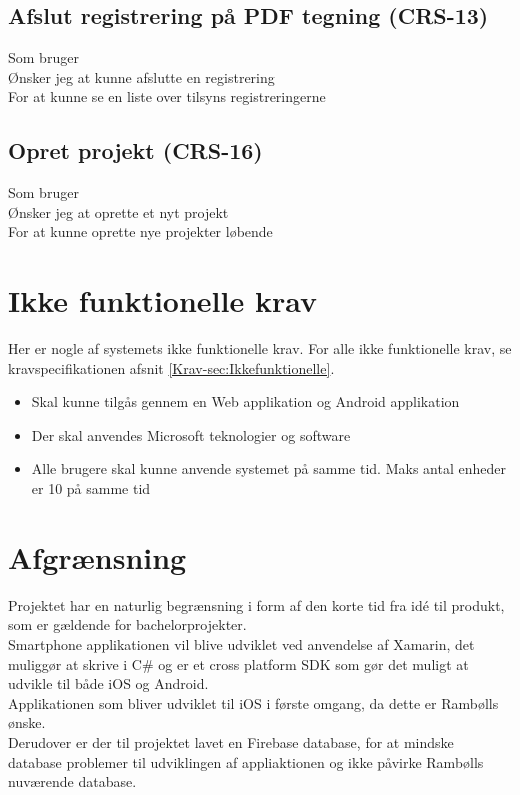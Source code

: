 	\subsection*{Afslut registrering på PDF tegning (CRS-13)}
	Som bruger\\
	Ønsker jeg at kunne afslutte en registrering\\
	For at kunne se en liste over tilsyns registreringerne
	
	\subsection*{Opret projekt (CRS-16)}
	Som bruger\\
	Ønsker jeg at oprette et nyt projekt\\
	For at kunne oprette nye projekter løbende
	

	\section{Ikke funktionelle krav}
	Her er nogle af systemets ikke funktionelle krav. For alle ikke funktionelle krav, se kravspecifikationen afsnit \ref{Krav-sec:Ikkefunktionelle}.
	\begin{itemize}[-]
		\itemsep 0.3em 
		\item Skal kunne tilgås gennem en Web applikation og Android applikation
		\item Der skal anvendes Microsoft teknologier og software
		\item Alle brugere skal kunne anvende systemet på samme tid. Maks antal enheder er 10 på samme tid %
	\end{itemize}


\section{Afgrænsning}
Projektet har en naturlig begrænsning i form af den korte tid fra idé til produkt, som er gældende for bachelorprojekter.\\
Smartphone applikationen vil blive udviklet ved anvendelse af Xamarin, det muliggør at skrive i C\# og er et cross platform SDK som gør det muligt at udvikle til både iOS og Android. \\
Applikationen som bliver udviklet til iOS i første omgang, da dette er Rambølls ønske. \\
Derudover er der til projektet lavet en Firebase database, for at mindske database problemer til udviklingen af appliaktionen og ikke påvirke Rambølls nuværende database.

